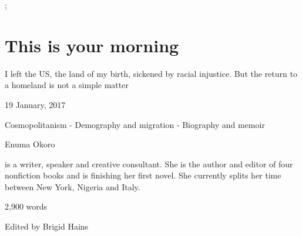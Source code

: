 \documentclass[../main.tex]{subfiles}
\begin{document}
;
\chapter{This is your morning}
\begin{subtitle}
I left the US, the land of my birth, sickened by racial injustice. But the return to a homeland is not a simple matter
\end{subtitle}

\begin{metadata}
19 January, 2017

Cosmopolitanism - Demography and migration - Biography and memoir



Enuma Okoro

is a writer, speaker and creative consultant. She is the author and editor of four nonfiction books and is finishing her first novel. She currently splits her time between New York, Nigeria and Italy. 

2,900 words

Edited by
Brigid Hains

\end{metadata}
\end{document}
